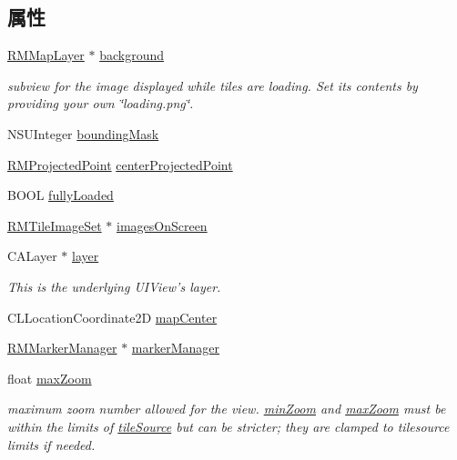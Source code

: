\subsection*{属性}
\begin{DoxyCompactItemize}
\item 
\hyperlink{interface_r_m_map_layer}{R\-M\-Map\-Layer} $\ast$ \hyperlink{interface_r_m_map_contents_a220a37d482a030e392788dee48ffc108}{background}
\begin{DoxyCompactList}\small\item\em subview for the image displayed while tiles are loading. Set its contents by providing your own \char`\"{}loading.\-png\char`\"{}. \end{DoxyCompactList}\item 
N\-S\-U\-Integer \hyperlink{interface_r_m_map_contents_a1ab8589d1d1fc05208eaffefcff9edaf}{bounding\-Mask}
\item 
\hyperlink{struct_r_m_projected_point}{R\-M\-Projected\-Point} \hyperlink{interface_r_m_map_contents_ae370cf3845309794b89e5b11290b520e}{center\-Projected\-Point}
\item 
B\-O\-O\-L \hyperlink{interface_r_m_map_contents_af81fdb306fe5675cc9ebc223379c773a}{fully\-Loaded}
\item 
\hyperlink{interface_r_m_tile_image_set}{R\-M\-Tile\-Image\-Set} $\ast$ \hyperlink{interface_r_m_map_contents_a4da52b65a26cd078dfa90c2d348c58c0}{images\-On\-Screen}
\item 
C\-A\-Layer $\ast$ \hyperlink{interface_r_m_map_contents_afba5a8749837d703d4c551c12e134c54}{layer}
\begin{DoxyCompactList}\small\item\em This is the underlying U\-I\-View's layer. \end{DoxyCompactList}\item 
C\-L\-Location\-Coordinate2\-D \hyperlink{interface_r_m_map_contents_a66dc32c1210bd62ef66dd729aebcf55c}{map\-Center}
\item 
\hyperlink{interface_r_m_marker_manager}{R\-M\-Marker\-Manager} $\ast$ \hyperlink{interface_r_m_map_contents_a2e28d0b3c7f2670181edb8b87ab0324f}{marker\-Manager}
\item 
float \hyperlink{interface_r_m_map_contents_afa0fef34433cbc987d0346dccbd151a1}{max\-Zoom}
\begin{DoxyCompactList}\small\item\em maximum zoom number allowed for the view. \hyperlink{interface_r_m_map_contents_ab434ff9dc95d209ad2d53cf8d0f1703b}{min\-Zoom} and \hyperlink{interface_r_m_map_contents_afa0fef34433cbc987d0346dccbd151a1}{max\-Zoom} must be within the limits of \hyperlink{interface_r_m_map_contents_afdc2f45aee8bcc5633182450fdea0cfc}{tile\-Source} but can be stricter; they are clamped to tilesource limits if needed. \end{DoxyCompactList}\item 

\end{DoxyCompactItemize}
